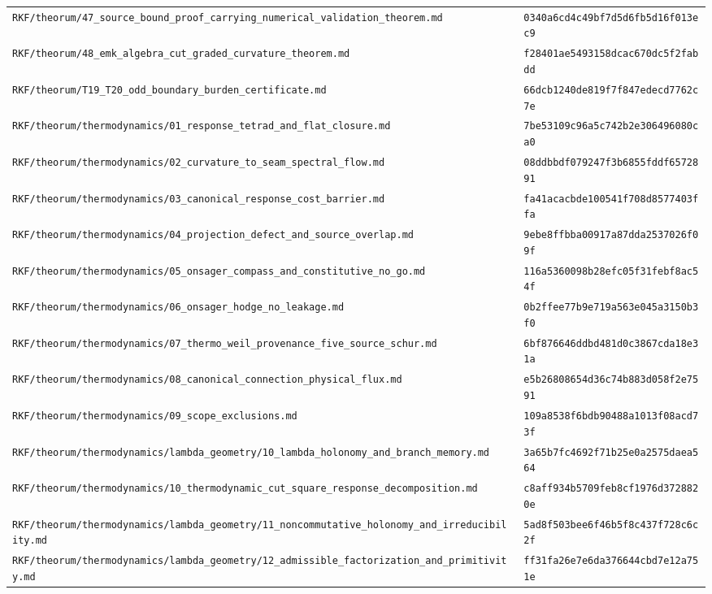 \documentclass[11pt,openany]{book}
\begin{document}
\begin{small}
\begin{longtable}{p{}p{}}
\texttt{RKF/theorum/47\_source\_bound\_proof\_carrying\_numerical\_validation\_theorem.md} & \texttt{0340a6cd4c49bf7d5d6fb5d16f013ec9}\\
\texttt{RKF/theorum/48\_emk\_algebra\_cut\_graded\_curvature\_theorem.md} & \texttt{f28401ae5493158dcac670dc5f2fabdd}\\
\texttt{RKF/theorum/T19\_T20\_odd\_boundary\_burden\_certificate.md} & \texttt{66dcb1240de819f7f847edecd7762c7e}\\
\texttt{RKF/theorum/thermodynamics/01\_response\_tetrad\_and\_flat\_closure.md} & \texttt{7be53109c96a5c742b2e306496080ca0}\\
\texttt{RKF/theorum/thermodynamics/02\_curvature\_to\_seam\_spectral\_flow.md} & \texttt{08ddbbdf079247f3b6855fddf6572891}\\
\texttt{RKF/theorum/thermodynamics/03\_canonical\_response\_cost\_barrier.md} & \texttt{fa41acacbde100541f708d8577403ffa}\\
\texttt{RKF/theorum/thermodynamics/04\_projection\_defect\_and\_source\_overlap.md} & \texttt{9ebe8ffbba00917a87dda2537026f09f}\\
\texttt{RKF/theorum/thermodynamics/05\_onsager\_compass\_and\_constitutive\_no\_go.md} & \texttt{116a5360098b28efc05f31febf8ac54f}\\
\texttt{RKF/theorum/thermodynamics/06\_onsager\_hodge\_no\_leakage.md} & \texttt{0b2ffee77b9e719a563e045a3150b3f0}\\
\texttt{RKF/theorum/thermodynamics/07\_thermo\_weil\_provenance\_five\_source\_schur.md} & \texttt{6bf876646ddbd481d0c3867cda18e31a}\\
\texttt{RKF/theorum/thermodynamics/08\_canonical\_connection\_physical\_flux.md} & \texttt{e5b26808654d36c74b883d058f2e7591}\\
\texttt{RKF/theorum/thermodynamics/09\_scope\_exclusions.md} & \texttt{109a8538f6bdb90488a1013f08acd73f}\\
\texttt{RKF/theorum/thermodynamics/lambda\_geometry/10\_lambda\_holonomy\_and\_branch\_memory.md} & \texttt{3a65b7fc4692f71b25e0a2575daea564}\\
\texttt{RKF/theorum/thermodynamics/10\_thermodynamic\_cut\_square\_response\_decomposition.md} & \texttt{c8aff934b5709feb8cf1976d3728820e}\\
\texttt{RKF/theorum/thermodynamics/lambda\_geometry/11\_noncommutative\_holonomy\_and\_irreducibility.md} & \texttt{5ad8f503bee6f46b5f8c437f728c6c2f}\\
\texttt{RKF/theorum/thermodynamics/lambda\_geometry/12\_admissible\_factorization\_and\_primitivity.md} & \texttt{ff31fa26e7e6da376644cbd7e12a751e}\\

\end{longtable}
\end{small}
\end{document}
